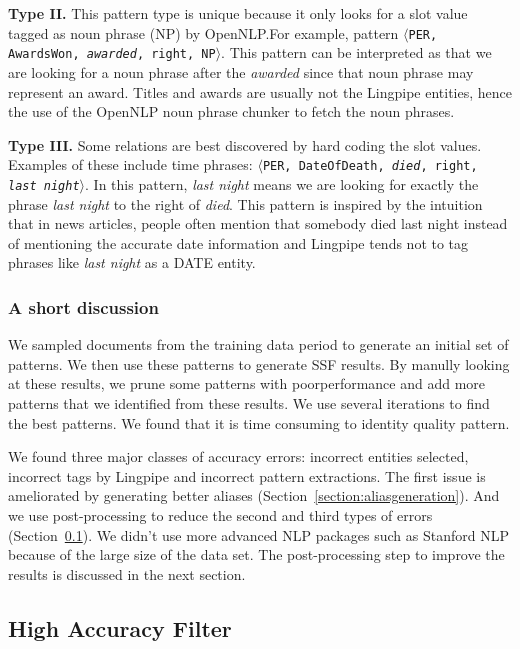 \textbf{Type II.} This pattern type is unique because it only looks for a slot value tagged as noun phrase (NP) by OpenNLP.\@ For example, pattern $\langle$\texttt{PER, AwardsWon, \textit{awarded}, right, NP}$\rangle$. This pattern can be interpreted as that we are looking for a noun phrase after the \textit{awarded} since that noun phrase may represent an award. Titles and awards are usually not the Lingpipe entities, hence the use of the OpenNLP noun phrase chunker to fetch the noun phrases.

\textbf{Type III.} Some relations are best discovered by hard coding the slot values. Examples of these include time phrases: $\langle$\texttt{PER, DateOfDeath, \textit{died}, right, \textit{last night}}$\rangle$. In this pattern, \textit{last night} means we are looking for exactly the phrase \textit{last night} to the right of \textit{died}. This pattern is inspired by the intuition that in news articles, people often mention that somebody died last night instead of mentioning the accurate date information and Lingpipe tends not to tag phrases like \textit{last night} as a DATE entity. 


\subsubsection{A short discussion}
We sampled documents from the training data period to generate an initial set of patterns. We then use these patterns to generate SSF results. By manully looking at these results, we prune some patterns with poor­performance and add more patterns that we identified from these results. We use several iterations to find the best patterns. We found that it is time consuming to identity quality pattern.


We found three major classes of accuracy errors: incorrect entities selected, incorrect tags by Lingpipe and incorrect pattern extractions. The first issue is ameliorated by generating better aliases (Section~\ref{section:aliasgeneration}). And we use post-processing to reduce the second and third types of errors (Section~\ref{section:highAccuracyFilter}). We didn't use more advanced NLP packages such as Stanford NLP because of the large size of the data set. The post-processing step to improve the results is discussed in the next section.

\subsection{High Accuracy Filter}
\label{section:highAccuracyFilter}

